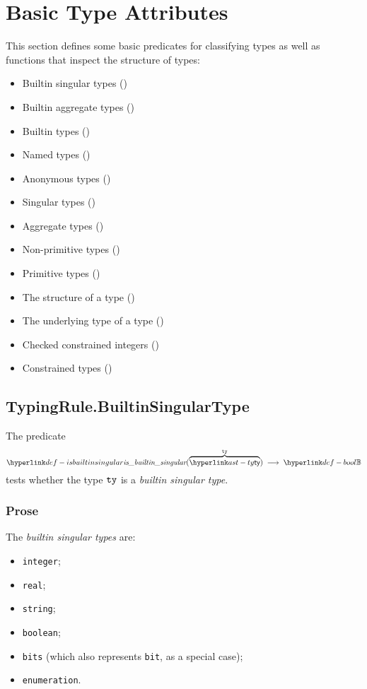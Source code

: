 \section{Basic Type Attributes\label{sec:BasicTypeAttributes}}

This section defines some basic predicates for classifying types as well as
functions that inspect the structure of types:
\begin{itemize}
  \item Builtin singular types ()
  \item Builtin aggregate types ()
  \item Builtin types ()
  \item Named types ()
  \item Anonymous types ()
  \item Singular types ()
  \item Aggregate types ()
  \item Non-primitive types ()
  \item Primitive types ()
  \item The structure of a type ()
  \item The underlying type of a type ()
  \item Checked constrained integers ()
  \item Constrained types ()
\end{itemize}

\subsection{TypingRule.BuiltinSingularType \label{sec:TypingRule.BuiltinSingularType}}
\hypertarget{def-isbuiltinsingular}{}
The predicate
\[
  \isbuiltinsingular(\overname{\ty}{\tty}) \;\aslto\; \Bool
\]
tests whether the type $\texttt{ty}$ is a \emph{builtin singular type}.

\subsubsection{Prose}
The \emph{builtin singular types} are:
\begin{itemize}
\item \texttt{integer};
\item \texttt{real};
\item \texttt{string};
\item \texttt{boolean};
\item \texttt{bits} (which also represents \texttt{bit}, as a special case);
\item \texttt{enumeration}.
\end{itemize}


